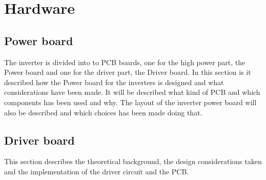 \section{Hardware}
\label{sec:hardware}


\subsection{Power board}
The inverter is divided into to PCB boards, one for the high power part, the Power board and one for the driver part, the Driver board. In this section is it described how the Power board for the inverters is designed and what considerations have been made. It will be described what kind of PCB and which components has been used and why. The layout of the inverter power board will also be described and which choices has been made doing that.

% 
% 

\subsection{Driver board}
This section describes the theoretical background, the design considerations taken and the implementation of the driver circuit and the PCB.


